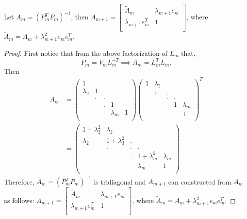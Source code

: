 \documentclass[10pt,a4paper]{article}
\begin{document}
\begin{prop}
Let $A_m=(P^T_mP_m)^{-1}$, then $A_{m+1}=\left[ \begin{array}{cc}
\tilde{A}_m & \lambda_{m+1}e_m \\
\lambda_{m+1}e^T_m & 1\\
\end{array} \right]$, where $\tilde{A}_m=A_m+\lambda^2_{m+1}e_me^T_m.$
\end{prop}

\begin{proof}
First notice that from the above factorization of $L_m$ that, 
$$P_m=V_mL^{-T}_m\implies A_m = L^T_mL_m.$$
Then 
\begin{align*}
A_m&=\left( \begin{array}{ccccc}
1 &  &  &  &  \\
\lambda_2 & 1 &  &  &  \\
 & . & . &  &  \\
 &  & . & 1 &  \\
 &  &  & \lambda_m & 1 \\
\end{array} \right)
\left( \begin{array}{ccccc}
1 & \lambda_2 &  &  &  \\
 & 1 & . &  &  \\
 &  & . & . &  \\
 &  &  & 1 & \lambda_m \\
 &  &  &  & 1 \\
\end{array} \right)^T \\
&= \left( \begin{array}{ccccc}
1+\lambda^2_2 & \lambda_2 &  &  &  \\
\lambda_2 & 1+\lambda^2_3 & . &  &  \\
 & . & . & . &  \\
 &  & . & 1+\lambda^2_m & \lambda_m \\
 &  &  & \lambda_m & 1 \\
\end{array} \right)
\end{align*}
Therefore, $A_m=(P^T_mP_m)^{-1}$ is tridiagonal and $A_{m+1}$ can constructed from $A_m$ as follows:
$A_{m+1}=\left[ \begin{array}{cc}
\tilde{A}_m & \lambda_{m+1}e_m \\
\lambda_{m+1}e^T_m & 1\\
\end{array} \right]$, where $\tilde{A}_m=A_m+\lambda^2_{m+1}e_me^T_m.$
\end{proof}
\end{document}
